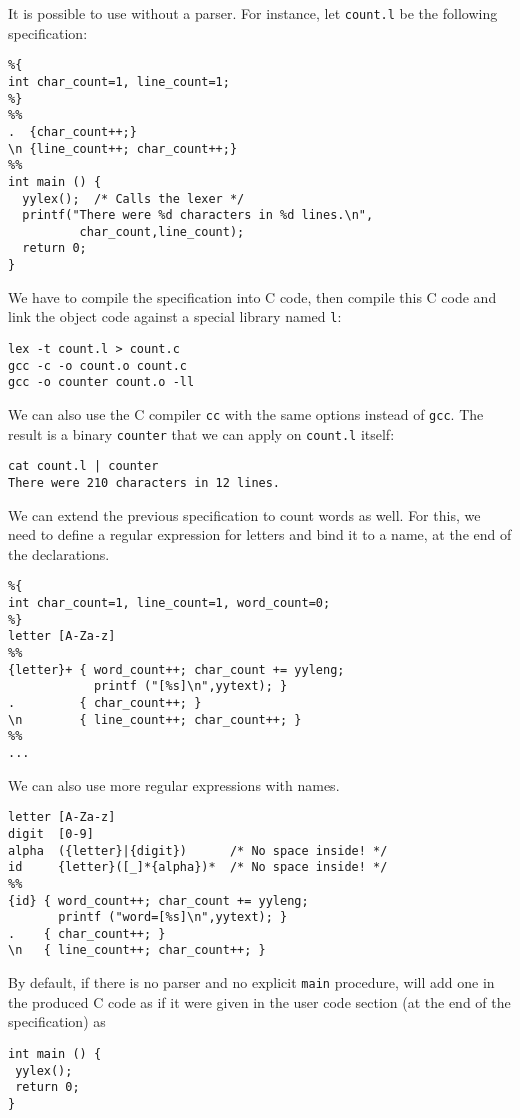 It is possible to use \Lex without a parser. For instance, let
\texttt{count.l} be the following \Lex specification:
\begin{verbatim}
%{
int char_count=1, line_count=1;
%}
%%
.  {char_count++;}
\n {line_count++; char_count++;}
%%
int main () {
  yylex();  /* Calls the lexer */
  printf("There were %d characters in %d lines.\n",
          char_count,line_count);
  return 0;
}
\end{verbatim}
We have to compile the \Lex specification into C code, then compile
this C code and link the object code against a special library named
\verb+l+:
\begin{verbatim}
lex -t count.l > count.c
gcc -c -o count.o count.c
gcc -o counter count.o -ll
\end{verbatim}
We can also use the C compiler \texttt{cc} with the same options
instead of \texttt{gcc}. The result is a binary \texttt{counter} that
we can apply on \texttt{count.l} itself:
\begin{verbatim}
cat count.l | counter
There were 210 characters in 12 lines.
\end{verbatim}
We can extend the previous specification to count words as well. For
this, we need to define a regular expression for letters and bind it
to a name, at the end of the declarations.
\begin{verbatim}
%{
int char_count=1, line_count=1, word_count=0;
%}
letter [A-Za-z]
%%
{letter}+ { word_count++; char_count += yyleng;
            printf ("[%s]\n",yytext); }
.         { char_count++; }
\n        { line_count++; char_count++; }
%%
...
\end{verbatim}
We can also use more regular expressions with names.
\begin{verbatim}
letter [A-Za-z]
digit  [0-9]
alpha  ({letter}|{digit})      /* No space inside! */
id     {letter}([_]*{alpha})*  /* No space inside! */
%%
{id} { word_count++; char_count += yyleng;
       printf ("word=[%s]\n",yytext); }
.    { char_count++; }
\n   { line_count++; char_count++; }
\end{verbatim}
By default, if there is no parser and no explicit \texttt{main}
procedure, \Lex will add one in the produced C code as if it were
given in the user code section (at the end of the specification) as
\begin{verbatim}
int main () {
 yylex();
 return 0;
}
\end{verbatim}
